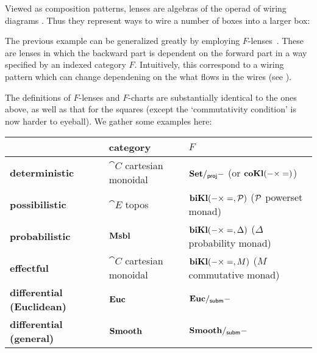 \begin{remark}
	Viewed as composition patterns, lenses are algebras of the operad of wiring diagrams \cite{spivak2013operad}. Thus they represent ways to wire a number of boxes into a larger box:
	\begin{figure}[H]
	\end{figure}
\end{remark}

\begin{example}
\label{ex:f-lenses}
	The previous example can be generalized greatly by employing $F$-lenses~\cite{spivak_generalized_2019}. These are lenses in which the backward part is dependent on the forward part in a way specified by an indexed category $F$.
	Intuitively, this correspond to a wiring pattern which can change dependening on the what flows in the wires (see \cite{spivak_poly_2020}).

	The definitions of $F$-lenses and $F$-charts are substantially identical to the ones above, as well as that for the squares (except the `commutativity condition' is now harder to eyeball).
	We gather some examples here:
	\begin{center}
		\begin{tabular}{l|l|l}
			& \textbf{category} & $F$\\
			\hline
			\textbf{deterministic} & $\cat C$ cartesian monoidal & $\Set/_{\sf proj} -$ (or $\coKl(- \times =)$) \\
			\textbf{possibilistic} & $\cat E$ topos & $\biKl(- \times =, \pow)$ ($\mathcal{P}$ powerset monad)\\
			\textbf{probabilistic} & $\Msbl$ & $\biKl(- \times =, \Delta)$ ($\Delta$ probability monad)\\
			\textbf{effectful} & $\cat C$ cartesian monoidal & $\biKl(- \times =, M)$ ($M$ commutative monad)\\
			\textbf{differential (Euclidean)} & $\Euc$ & $\Euc/_{\sf subm}-$\\
			\textbf{differential (general)} & $\Smooth$ & $\Smooth/_{\sf subm}-$
		\end{tabular}
	\end{center}
\end{example}


